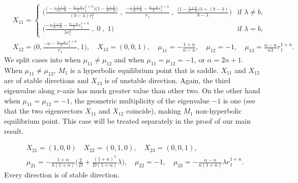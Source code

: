 \documentclass[a4paper,11pt]{article}
\begin{document}
\begin{align*}
&X_{11} = 
\begin{cases}
\bigg(  \frac{\Big(-n\frac{1+n}{\alpha-n} - \frac{\alpha-n}{\lambda}r_1^{1+n}\Big)\Big(1-\frac{1+n}{\alpha-n}\Big)}{(b-\lambda)r_1^2}\;,\;\frac{-n\frac{1+n}{\alpha-n} - \frac{\alpha-n}{\lambda}r_1^{1+n}}{r_1}\;,\;\frac{\big(1-\frac{1+n}{\alpha-n}\big)\lambda + (b-\lambda)}{b-\lambda}\bigg) &\text{if $\lambda\ne b$,}\\
\bigg(  \frac{-n\frac{1+n}{\alpha-n} - \frac{\alpha-n}{\lambda}r_1^{1+n}}{\lambda r_1^2}\;,\;0\;,\;1\bigg) & \text{if $\lambda=b$,}
\end{cases}\\
 &X_{12} = \bigg(0, \frac{-n- \frac{\alpha-n}{\lambda}r_1^{1+n}}{r_1}, 1\bigg), \quad
 X_{13} = (0,0,1), \quad \mu_{11} =-\frac{1+n}{\alpha-n}, \quad \mu_{12}=-1, \quad \mu_{13} = \frac{\alpha-n}{n\lambda}r_1^{1+n}.
\end{align*}
We split cases into when $\mu_{11}\ne\mu_{12}$ and when $\mu_{11}=\mu_{12}=-1$, or $\alpha=2n+1$. When $\mu_{11}\ne\mu_{12}$, $M_1$ is a hyperbolic equilibrium point that is saddle. $X_{11}$ and $X_{12}$ are of stable directions and $X_{13}$ is of unstable direction. Again, the third eigenvalue along $r$-axis has much greater value than other two. On the other hand when $\mu_{11}=\mu_{12}=-1$, the geometric multiplicity of the eigenvalue $-1$ is one (see that the two eigenvectors $X_{11}$ and $X_{12}$ coincide), making $M_1$ non-hyperbolic equilibrium point. This case will be treated separately in the proof of our main result. 
\medskip

\begin{align*}
 &X_{21} = (1,0,0) \quad X_{22}=(0,1,0), \quad X_{23}=(0,0,1),\\
 &\mu_{21} =-\frac{1+\alpha}{\lambda(1+n)} \Big(\frac{2}{D} + \frac{(1+n)^2}{D(1+\alpha)}\lambda\Big), \quad \mu_{22}=-1, \quad \mu_{23} = -\frac{\alpha-n}{n(1+n)}\lambda r_1^{1+n}.
\end{align*}
Every direction is of stable direction.
\medskip
\end{document}
